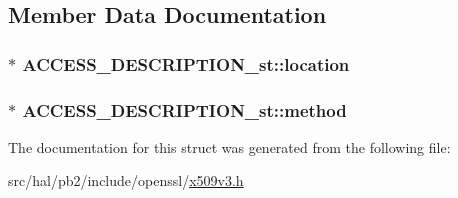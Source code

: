 \subsection{Member Data Documentation}
\subsubsection[{\texorpdfstring{location}{location}}]{$\ast$ A\+C\+C\+E\+S\+S\+\_\+\+D\+E\+S\+C\+R\+I\+P\+T\+I\+O\+N\+\_\+st\+::location}\hypertarget{struct_a_c_c_e_s_s___d_e_s_c_r_i_p_t_i_o_n__st_ae554d8ab9233f6c313c43fc1de26a4ae}{}\label{struct_a_c_c_e_s_s___d_e_s_c_r_i_p_t_i_o_n__st_ae554d8ab9233f6c313c43fc1de26a4ae}
\subsubsection[{\texorpdfstring{method}{method}}]{$\ast$ A\+C\+C\+E\+S\+S\+\_\+\+D\+E\+S\+C\+R\+I\+P\+T\+I\+O\+N\+\_\+st\+::method}\hypertarget{struct_a_c_c_e_s_s___d_e_s_c_r_i_p_t_i_o_n__st_afba634277470759ab5ca872db4693fe1}{}\label{struct_a_c_c_e_s_s___d_e_s_c_r_i_p_t_i_o_n__st_afba634277470759ab5ca872db4693fe1}


The documentation for this struct was generated from the following file\+:\begin{DoxyCompactItemize}
\item 
src/hal/pb2/include/openssl/\hyperlink{x509v3_8h}{x509v3.\+h}\end{DoxyCompactItemize}
